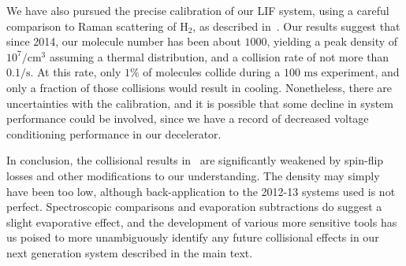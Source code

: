 \documentclass[%
 reprint,
 amsmath,amssymb,
 aps,
prl,
]{revtex4-1}
\begin{document}
We have also pursued the precise calibration of our LIF system, using a careful comparison to Raman scattering of $\text{H}_2$, as described in~\cite{Bischel1986}. 
Our results suggest that since 2014, our molecule number has been about $1000$, yielding a peak density of $10^7/\text{cm}^3$ assuming a thermal distribution, and a collision rate of not more than $0.1/\text{s}$.
At this rate, only $1\%$ of molecules collide during a $100\text{ ms}$ experiment, and only a fraction of those collisions would result in cooling. 
Nonetheless, there are uncertainties with the calibration, and it is possible that some decline in system performance could be involved, since we have a record of decreased voltage conditioning performance in our decelerator.

In conclusion, the collisional results in~\cite{Stuhl2012evap,Stuhl2013} are significantly weakened by spin-flip losses and other modifications to our understanding. The density may simply have been too low, although back-application to the 2012-13 systems used is not perfect. Spectroscopic comparisons and evaporation subtractions do suggest a slight evaporative effect, and the development of various more sensitive tools has us poised to more unambiguously identify any future collisional effects in our next generation system described in the main text.



\end{document}
